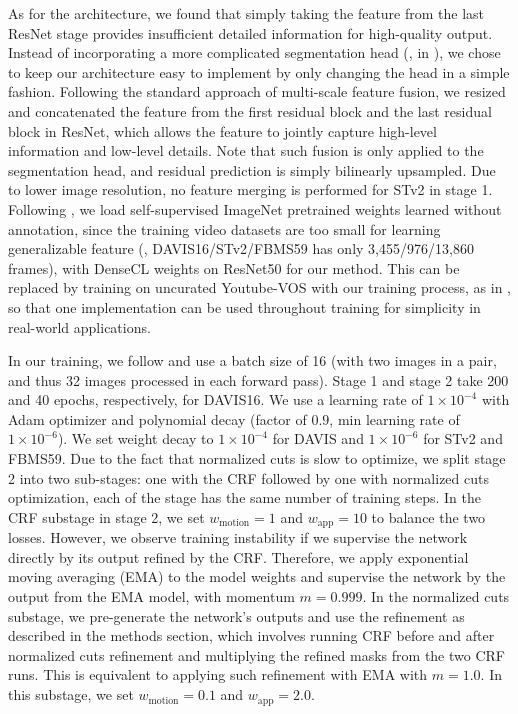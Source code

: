 As for the architecture, we found that simply taking the feature from the last ResNet stage provides insufficient detailed information for high-quality output. Instead of incorporating a more complicated segmentation head (\eg, \cite{cheng2021maskformer} in \cite{choudhury2022guess}), we chose to keep our architecture easy to implement by only changing the head in a simple fashion. Following the standard approach of multi-scale feature fusion, we resized and concatenated the feature from the first residual block and the last residual block in ResNet, which allows the feature to jointly capture high-level information and low-level details. Note that such fusion is only applied to the segmentation head, and residual prediction is simply bilinearly upsampled. Due to lower image resolution, no feature merging is performed for STv2 in stage 1. Following \cite{choudhury2022guess}, we load self-supervised ImageNet pretrained weights learned without annotation, since the training video datasets are too small for learning generalizable feature (\eg, DAVIS16/STv2/FBMS59 has only 3,455/976/13,860 frames), with DenseCL weights \cite{ILSVRC15,wang2021dense} on ResNet50 for our method. This can be replaced by training on uncurated Youtube-VOS \cite{xu2018youtube} with our training process, as in \cite{liu2021emergence}, so that one implementation can be used throughout training for simplicity in real-world applications.

In our training, we follow \cite{liu2021emergence} and use a batch size of 16 (with two images in a pair, and thus 32 images processed in each forward pass). Stage 1 and stage 2 take 200 and 40 epochs, respectively, for DAVIS16. We use a learning rate of $1\times10^{-4}$ with Adam optimizer \cite{kingma2014adam} and polynomial decay (factor of $0.9$, min learning rate of $1\times10^{-6}$). We set weight decay to $1\times10^{-4}$ for DAVIS and $1\times10^{-6}$ for STv2 and FBMS59. Due to the fact that normalized cuts is slow to optimize, we split stage 2 into two sub-stages: one with the CRF followed by one with normalized cuts optimization, each of the stage has the same number of training steps. In the CRF substage in stage 2, we set $w_\text{motion}=1$ and $w_\text{app}=10$ to balance the two losses. However, we observe training instability if we supervise the network directly by its output refined by the CRF. Therefore, we apply exponential moving averaging (EMA) to the model weights and supervise the network by the output from the EMA model, with momentum $m=0.999$. In the normalized cuts substage, we pre-generate the network's outputs and use the refinement as described in the methods section, which involves running CRF before and after normalized cuts refinement and multiplying the refined masks from the two CRF runs. This is equivalent to applying such refinement with EMA with $m=1.0$. In this substage, we set $w_\text{motion}=0.1$ and $w_\text{app}=2.0$.

